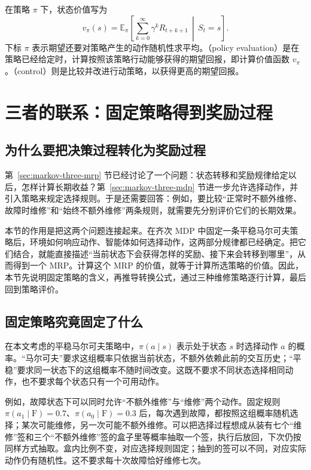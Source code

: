 \documentclass[UTF8]{ctexart}
\begin{document}
在策略 $\pi$ 下，状态价值写为
\begin{equation}
  v_\pi(s)=\mathbb E_\pi\left[
    \sum_{k=0}^{\infty}\gamma^kR_{t+k+1}\,\middle|\,S_t=s
  \right].
  \label{eq:markov-three-policy-value}
\end{equation}
下标 $\pi$ 表示期望还要对策略产生的动作随机性求平均。（policy evaluation）是在策略已经给定时，计算按照该策略行动能够获得的期望回报，即计算价值函数 $v_\pi$。（control）则是比较并改进行动策略，以获得更高的期望回报。

\section{三者的联系：固定策略得到奖励过程}
\label{sec:markov-three-connection}

\subsection{为什么要把决策过程转化为奖励过程}

第~\ref{sec:markov-three-mrp} 节已经讨论了一个问题：状态转移和奖励规律给定以后，怎样计算长期收益？第~\ref{sec:markov-three-mdp} 节进一步允许选择动作，并引入策略来规定选择规则。于是还需要回答：例如，要比较“正常时不额外维修、故障时维修”和“始终不额外维修”两条规则，就需要先分别评价它们的长期效果。

本节的作用是把这两个问题连接起来。在齐次 MDP 中固定一条平稳马尔可夫策略后，环境如何响应动作、智能体如何选择动作，这两部分规律都已经确定。把它们结合，就能直接描述“当前状态下会获得怎样的奖励、接下来会转移到哪里”，从而得到一个 MRP。计算这个 MRP 的价值，就等于计算所选策略的价值。因此，本节先说明固定策略的含义，再推导转换公式，通过三种维修策略逐行计算，最后回到策略评价。

\subsection{固定策略究竟固定了什么}

在本文考虑的平稳马尔可夫策略中，$\pi(a\mid s)$ 表示处于状态 $s$ 时选择动作 $a$ 的概率。“马尔可夫”要求这组概率只依据当前状态，不额外依赖此前的交互历史；“平稳”要求同一状态下的这组概率不随时间改变。这既不要求不同状态选择相同动作，也不要求每个状态只有一个可用动作。

例如，故障状态下可以同时允许“不额外维修”与“维修”两个动作。固定规则 $\pi(a_1\mid\mathrm F)=0.7$、$\pi(a_0\mid\mathrm F)=0.3$ 后，每次遇到故障，都按照这组概率随机选择；某次可能维修，另一次可能不额外维修。可以把选择过程想成从装有七个“维修”签和三个“不额外维修”签的盒子里等概率抽取一个签，执行后放回，下次仍按同样方式抽取。盒内比例不变，对应选择规则固定；抽到的签可以不同，对应实际动作仍有随机性。这不要求每十次故障恰好维修七次。
\end{document}
